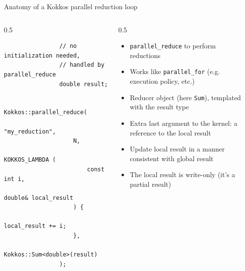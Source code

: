 \documentclass[
    aspectratio=169,
]{beamer}
\begin{document}
\begin{frame}[fragile]{Anatomy of a Kokkos parallel reduction loop}
    \begin{columns}
        \begin{column}{0.5\linewidth}
            \begin{verbatim}
                // no initialization needed,
                // handled by parallel_reduce
                double result;

                Kokkos::parallel_reduce(
                    "my_reduction",
                    N,
                    KOKKOS_LAMBDA (
                        const int i,
                        double& local_result
                    ) {
                        local_result += i;
                    },
                    Kokkos::Sum<double>(result)
                );
            \end{verbatim}
        \end{column}
        \begin{column}{0.5\linewidth}
            \begin{itemize}
                \item \texttt{parallel_reduce} to perform reductions
                \item Works like \texttt{parallel\_for} (e.g. execution policy, etc.)
                \item Reducer object (here \texttt{Sum}), templated with the result type
                \item Extra last argument to the kernel: a reference to the local result
                \item Update local result in a manner consistent with global result
                \item The local result is write-only (it's a partial result)
            \end{itemize}
        \end{column}
    \end{columns}
\end{frame}
\end{document}
